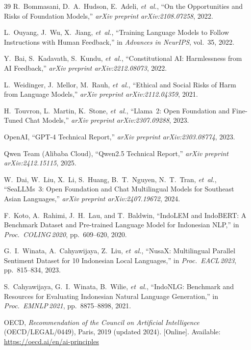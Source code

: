 ﻿\documentclass[conference]{IEEEtran}
\begin{document}
\begin{thebibliography}{39}
R.~Bommasani, D.~A.~Hudson, E.~Adeli, \textit{et~al.}, ``On the Opportunities
and Risks of Foundation Models,'' \textit{arXiv preprint arXiv:2108.07258}, 2022.

L.~Ouyang, J.~Wu, X.~Jiang, \textit{et~al.}, ``Training Language Models to
Follow Instructions with Human Feedback,'' in \textit{Advances in NeurIPS},
vol.~35, 2022.

Y.~Bai, S.~Kadavath, S.~Kundu, \textit{et~al.}, ``Constitutional AI:
Harmlessness from AI Feedback,'' \textit{arXiv preprint arXiv:2212.08073}, 2022.

L.~Weidinger, J.~Mellor, M.~Rauh, \textit{et~al.}, ``Ethical and Social Risks
of Harm from Language Models,'' \textit{arXiv preprint arXiv:2112.04359}, 2021.

H.~Touvron, L.~Martin, K.~Stone, \textit{et~al.}, ``Llama~2: Open Foundation
and Fine-Tuned Chat Models,'' \textit{arXiv preprint arXiv:2307.09288}, 2023.

OpenAI, ``GPT-4 Technical Report,'' \textit{arXiv preprint arXiv:2303.08774},
2023.

Qwen Team (Alibaba Cloud), ``Qwen2.5 Technical Report,''
\textit{arXiv preprint arXiv:2412.15115}, 2025.

W.~Dai, W.~Liu, X.~Li, S.~Huang, B.~T.~Nguyen, N.~T.~Tran, \textit{et~al.},
``SeaLLMs~3: Open Foundation and Chat Multilingual Models for Southeast Asian
Languages,'' \textit{arXiv preprint arXiv:2407.19672}, 2024.

F.~Koto, A.~Rahimi, J.~H.~Lau, and T.~Baldwin, ``IndoLEM and IndoBERT:
A Benchmark Dataset and Pre-trained Language Model for Indonesian NLP,''
in \textit{Proc.\ COLING\,2020}, pp.~609--620, 2020.

G.~I.~Winata, A.~Cahyawijaya, Z.~Liu, \textit{et~al.}, ``NusaX: Multilingual
Parallel Sentiment Dataset for 10 Indonesian Local Languages,''
in \textit{Proc.\ EACL\,2023}, pp.~815--834, 2023.

S.~Cahyawijaya, G.~I.~Winata, B.~Wilie, \textit{et~al.}, ``IndoNLG: Benchmark
and Resources for Evaluating Indonesian Natural Language Generation,''
in \textit{Proc.\ EMNLP\,2021}, pp.~8875--8898, 2021.

OECD, \textit{Recommendation of the Council on Artificial Intelligence}
(OECD/LEGAL/0449), Paris, 2019 (updated 2024). [Online]. Available:
\url{https://oecd.ai/en/ai-principles}


\end{thebibliography}
\end{document}
